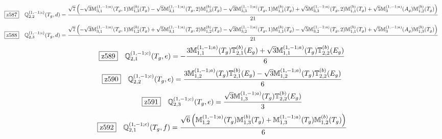 \documentclass[fleqn,10pt,landscape]{jsarticle}
\begin{document}
\begin{dmath*}
\hspace*{3mm}\fbox{z587}\quad \mathbb{Q}_{2,2}^{(1,-1;c)}(T_{g},d)=\frac{\sqrt{7} \left(- \sqrt{3} \mathbb{M}_{3,1}^{(1,-1;a)}(T_{g},1) \mathbb{M}_{1,3}^{(b)}(T_{g}) - \sqrt{5} \mathbb{M}_{3,1}^{(1,-1;a)}(T_{g},2) \mathbb{M}_{1,3}^{(b)}(T_{g}) - \sqrt{3} \mathbb{M}_{3,3}^{(1,-1;a)}(T_{g},1) \mathbb{M}_{1,1}^{(b)}(T_{g}) + \sqrt{5} \mathbb{M}_{3,3}^{(1,-1;a)}(T_{g},2) \mathbb{M}_{1,1}^{(b)}(T_{g}) + \sqrt{5} \mathbb{M}_{3}^{(1,-1;a)}(A_{g}) \mathbb{M}_{1,2}^{(b)}(T_{g})\right)}{21}
\end{dmath*}
\begin{dmath*}
\hspace*{3mm}\fbox{z588}\quad \mathbb{Q}_{2,3}^{(1,-1;c)}(T_{g},d)=\frac{\sqrt{7} \left(- \sqrt{3} \mathbb{M}_{3,1}^{(1,-1;a)}(T_{g},1) \mathbb{M}_{1,2}^{(b)}(T_{g}) + \sqrt{5} \mathbb{M}_{3,1}^{(1,-1;a)}(T_{g},2) \mathbb{M}_{1,2}^{(b)}(T_{g}) - \sqrt{3} \mathbb{M}_{3,2}^{(1,-1;a)}(T_{g},1) \mathbb{M}_{1,1}^{(b)}(T_{g}) - \sqrt{5} \mathbb{M}_{3,2}^{(1,-1;a)}(T_{g},2) \mathbb{M}_{1,1}^{(b)}(T_{g}) + \sqrt{5} \mathbb{M}_{3}^{(1,-1;a)}(A_{g}) \mathbb{M}_{1,3}^{(b)}(T_{g})\right)}{21}
\end{dmath*}
\begin{dmath*}
\hspace*{3mm}\fbox{z589}\quad \mathbb{Q}_{2,1}^{(1,-1;c)}(T_{g},e)=- \frac{3 \mathbb{M}_{1,1}^{(1,-1;a)}(T_{g}) \mathbb{T}_{2,1}^{(b)}(E_{g}) + \sqrt{3} \mathbb{M}_{1,1}^{(1,-1;a)}(T_{g}) \mathbb{T}_{2,2}^{(b)}(E_{g})}{6}
\end{dmath*}
\begin{dmath*}
\hspace*{3mm}\fbox{z590}\quad \mathbb{Q}_{2,2}^{(1,-1;c)}(T_{g},e)=\frac{3 \mathbb{M}_{1,2}^{(1,-1;a)}(T_{g}) \mathbb{T}_{2,1}^{(b)}(E_{g}) - \sqrt{3} \mathbb{M}_{1,2}^{(1,-1;a)}(T_{g}) \mathbb{T}_{2,2}^{(b)}(E_{g})}{6}
\end{dmath*}
\begin{dmath*}
\hspace*{3mm}\fbox{z591}\quad \mathbb{Q}_{2,3}^{(1,-1;c)}(T_{g},e)=\frac{\sqrt{3} \mathbb{M}_{1,3}^{(1,-1;a)}(T_{g}) \mathbb{T}_{2,2}^{(b)}(E_{g})}{3}
\end{dmath*}
\begin{dmath*}
\hspace*{3mm}\fbox{z592}\quad \mathbb{Q}_{2,1}^{(1,-1;c)}(T_{g},f)=\frac{\sqrt{6} \left(\mathbb{M}_{1,2}^{(1,-1;a)}(T_{g}) \mathbb{M}_{1,3}^{(b)}(T_{g}) + \mathbb{M}_{1,3}^{(1,-1;a)}(T_{g}) \mathbb{M}_{1,2}^{(b)}(T_{g})\right)}{6}
\end{dmath*}
\end{document}
